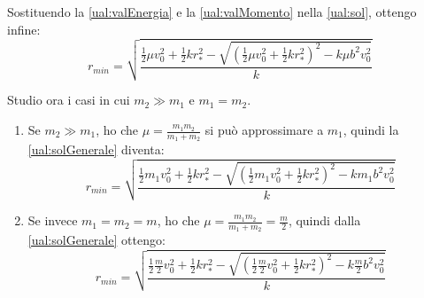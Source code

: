 \documentclass[../main.tex]{subfiles}
\begin{document}
Sostituendo la \cref{ual:valEnergia} e la \cref{ual:valMomento} nella \cref{ual:sol}, ottengo infine:
\begin{equation} \label{ual:solGenerale}
	r_{min}=\sqrt{\frac{\frac12\mu v_0^2+\frac12 kr_*^2-\sqrt{(\frac12\mu v_0^2+\frac12 kr_*^2)^2-k\mu b^2v_0^2}}{k}}
\end{equation}

Studio ora i casi in cui $m_2\gg m_1$ e $m_1=m_2$.
\begin{enumerate}
	\item Se $m_2\gg m_1$, ho che $\mu=\frac{m_1m_2}{m_1+m_2}$ si può approssimare a $m_1$, quindi la \cref{ual:solGenerale} diventa:
	\begin{equation*}
		r_{min}=\sqrt{\frac{\frac12m_1 v_0^2+\frac12 kr_*^2-\sqrt{(\frac12m_1 v_0^2+\frac12 kr_*^2)^2-km_1 b^2v_0^2}}{k}}
	\end{equation*}
	\item Se invece $m_1=m_2=m$, ho che $\mu=\frac{m_1m_2}{m_1+m_2}=\frac m2$, quindi dalla \cref{ual:solGenerale} ottengo:
	\begin{equation*}
		r_{min}=\sqrt{\frac{\frac12\frac m2 v_0^2+\frac12 kr_*^2-\sqrt{(\frac12\frac m2 v_0^2+\frac12 kr_*^2)^2-k\frac m2 b^2v_0^2}}{k}}
	\end{equation*}
\end{enumerate}
\end{document}
